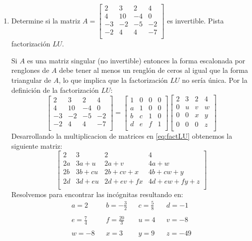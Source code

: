 \documentclass[12pt,titlepage]{article}
\begin{document}
\begin{enumerate}
\clearpage
\item 	Determine si la matriz $A=\begin{bmatrix}2&3&2&4\\4&10&-4&0\\-3&-2&-5&-2\\-2&4&4&-7\\\end{bmatrix}$ es invertible. Pista factorización $LU$.
\par \parskip 8mm
Si $A$ es una matriz singular (no invertible) entonces la forma escalonada por renglones de $A$ debe tener al menos un renglón de ceros al igual que la forma triangular de $A$, lo que implica que la factorización $LU$ no sería única. Por la definición de la factorización $LU$:
\begin{equation} 
    \left[\begin{matrix}2&3&2&4\\4&10&-4&0\\-3&-2&-5&-2\\-2&4&4&-7\\\end{matrix}\right]=\begin{bmatrix}1&0&0&0\\a&1&0&0\\b&c&1&0\\d&e&f&1\\\end{bmatrix}\begin{bmatrix}2&3&2&4\\0&u&v&w\\0&0&x&y\\0&0&0&z\\\end{bmatrix}\label{eq:factLU}
\end{equation}
Desarrollando la multiplicacion de matrices en \eqref{eq:factLU} obtenemos la siguiente matriz:
\begin{equation}
    \left[\begin{matrix}2&3&2&4\\2a&3a+u&2a+v&4a+w\\2b&3b+cu&2b+cv+x&4b+cw+y\\2d&3d+eu&2d+ev+fx&4d+ew+fy+z\\\end{matrix}\right]\label{eq:factLU2}
\end{equation}
Resolvemos para encontrar las incógnitas resultando en:
\begin{equation}
    \begin{matrix}a=2&&b=-\frac{3}{2}&&c=\frac{5}{8}&&d=-1\\\\e=\frac{7}{4}&&f=\frac{20}{3}&&u=4&&v=-8\\\\w=-8&&x=3&&y=9&&z=-49\end{matrix}\label{eq:resultadoLU}

\end{equation}
\end{enumerate}
\end{document}
